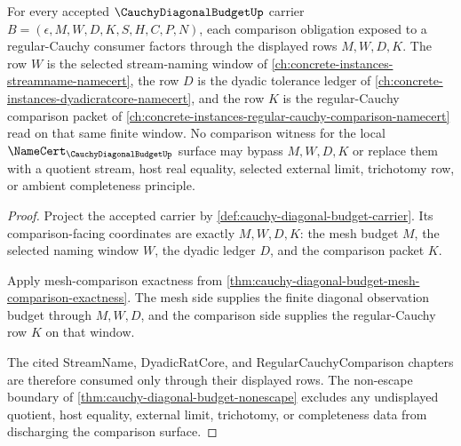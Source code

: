 \begin{theorem}
\label{thm:cauchy-diagonal-budget-regseq-window-scope}
For every accepted $\CauchyDiagonalBudgetUp$ carrier $B=(\epsilon,M,W,D,K,S,H,C,P,N)$, each comparison obligation exposed to a regular-Cauchy consumer factors through the displayed rows $M,W,D,K$. The row $W$ is the selected stream-naming window of \autoref{ch:concrete-instances-streamname-namecert}, the row $D$ is the dyadic tolerance ledger of \autoref{ch:concrete-instances-dyadicratcore-namecert}, and the row $K$ is the regular-Cauchy comparison packet of \autoref{ch:concrete-instances-regular-cauchy-comparison-namecert} read on that same finite window. No comparison witness for the local $\NameCert_{\CauchyDiagonalBudgetUp}$ surface may bypass $M,W,D,K$ or replace them with a quotient stream, host real equality, selected external limit, trichotomy row, or ambient completeness principle.
\end{theorem}
\begin{proof}
Project the accepted carrier by \autoref{def:cauchy-diagonal-budget-carrier}. Its comparison-facing coordinates are exactly $M,W,D,K$: the mesh budget $M$, the selected naming window $W$, the dyadic ledger $D$, and the comparison packet $K$.

Apply mesh-comparison exactness from \autoref{thm:cauchy-diagonal-budget-mesh-comparison-exactness}. The mesh side supplies the finite diagonal observation budget through $M,W,D$, and the comparison side supplies the regular-Cauchy row $K$ on that window.

The cited StreamName, DyadicRatCore, and RegularCauchyComparison chapters are therefore consumed only through their displayed rows. The non-escape boundary of \autoref{thm:cauchy-diagonal-budget-nonescape} excludes any undisplayed quotient, host equality, external limit, trichotomy, or completeness data from discharging the comparison surface.
\end{proof}

